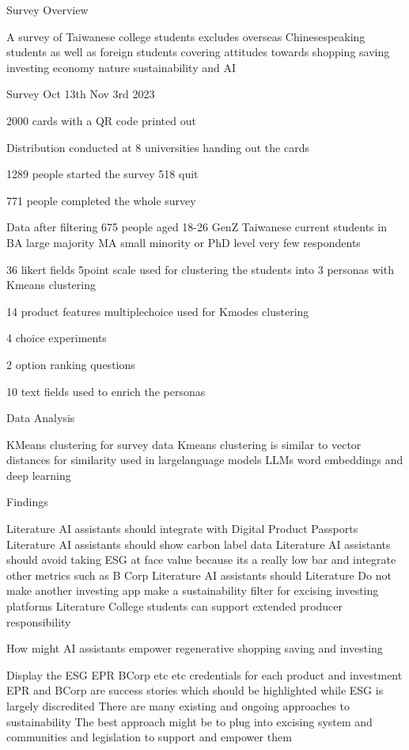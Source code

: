 \documentclass[
  letterpaper,
  DIV=11,
  numbers=noendperiod]{scrartcl}
\begin{document}
Survey Overview

A survey of Taiwanese college students excludes overseas Chinesespeaking
students as well as foreign students covering attitudes towards shopping
saving investing economy nature sustainability and AI

Survey Oct 13th Nov 3rd 2023

2000 cards with a QR code printed out

Distribution conducted at 8 universities handing out the cards

1289 people started the survey 518 quit

771 people completed the whole survey

Data after filtering 675 people aged 18-26 GenZ Taiwanese current
students in BA large majority MA small minority or PhD level very few
respondents

36 likert fields 5point scale used for clustering the students into 3
personas with Kmeans clustering

14 product features multiplechoice used for Kmodes clustering

4 choice experiments

2 option ranking questions

10 text fields used to enrich the personas

Data Analysis

KMeans clustering for survey data Kmeans clustering is similar to vector
distances for similarity used in largelanguage models LLMs word
embeddings and deep learning

Findings

Literature AI assistants should integrate with Digital Product Passports
Literature AI assistants should show carbon label data Literature AI
assistants should avoid taking ESG at face value because its a really
low bar and integrate other metrics such as B Corp Literature AI
assistants should Literature Do not make another investing app make a
sustainability filter for excising investing platforms Literature
College students can support extended producer responsibility

How might AI assistants empower regenerative shopping saving and
investing

Display the ESG EPR BCorp etc etc credentials for each product and
investment EPR and BCorp are success stories which should be highlighted
while ESG is largely discredited There are many existing and ongoing
approaches to sustainability The best approach might be to plug into
excising system and communities and legislation to support and empower
them
\end{document}
